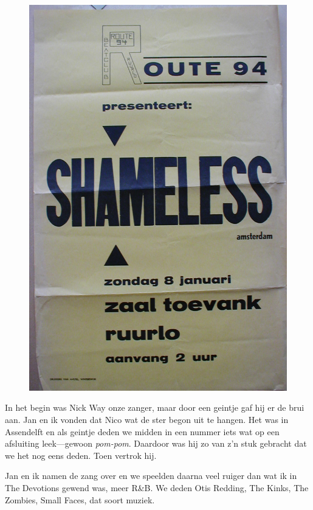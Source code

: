 \documentclass[12pt,twoside, openright]{memoir}
\begin{document}
\begin{figure}
\centering
\includegraphics[width=\textwidth]{img/170biljet}
\end{figure}

In het begin was Nick Way onze zanger, maar door een geintje gaf hij er de brui aan. Jan en ik  vonden dat Nico wat de ster begon uit te hangen. Het was in Assendelft en als geintje deden we midden in een nummer iets wat op een afsluiting leek---gewoon \emph{pom-pom}. Daardoor was hij zo van z’n stuk gebracht dat we het nog eens deden. Toen vertrok hij.

Jan en ik namen de zang over en we speelden daarna veel ruiger dan wat ik in The Devotions gewend was, meer R\&B. We deden Otis Redding, The Kinks, The Zombies, Small Faces, dat soort muziek.
\end{document}

